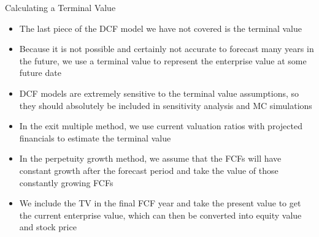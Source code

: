 \documentclass[]{article}
\begin{document}
\begin{section}{Calculating a Terminal Value}
\begin{itemize}
\item The last piece of the DCF model we have not covered is the terminal value
\item Because it is not possible and certainly not accurate to forecast many years in the future, we use a terminal value to represent the enterprise value at some future date
\item DCF models are extremely sensitive to the terminal value assumptions, so they should absolutely be included in sensitivity analysis and MC simulations
\item In the exit multiple method, we use current valuation ratios with projected financials to estimate the terminal value
\item In the perpetuity growth method, we assume that the FCFs will have constant growth after the forecast period and take the value of those constantly growing FCFs
\item We include the TV in the final FCF year and take the present value to get the current enterprise value, which can then be converted into equity value and stock price
\end{itemize}
\end{section}
\end{document}
